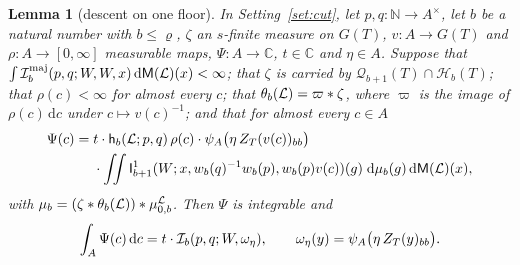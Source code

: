 \documentclass[11pt,a4paper]{article}
\theoremstyle{plainx}
\newtheorem{lemma}[theorem]{Lemma}
\theoremstyle{uprightx}
\newcommand{\cL}{\mathcal{L}}
\newcommand{\CC}{\mathbb{C}}
\newcommand{\NN}{\mathbb{N}}
\newcommand{\dd}{\mathrm{d}}
\newcommand{\GT}[1]{G(#1)}
\newcommand{\Hl}[2]{\mathcal{H}_{#1}(#2)}
\newcommand{\Ql}[2]{\mathcal{Q}_{#1}(#2)}
\newcommand{\ZT}[2]{Z_{#1}(#2)}
\newcommand{\wl}[2]{w_{#1}(#2)}
\begin{document}
\begin{lemma}[descent on one floor]\label{l:succ}
In Setting~\ref{set:cut}, let $p,q\colon\NN\to A^{\times}$, let $b$ be a natural number with $b\le\varrho$, $\zeta$
an $s$-finite measure on $\GT{T}$, $v\colon A\to\GT{T}$ and $\rho\colon A\to[0,\infty]$ measurable maps,
$\Psi\colon A\to\CC$, $t\in\CC$ and $\eta\in A$. Suppose that
$\int\formMajorant{b}{p}{q}{W}{W}{x}\,\dd\groupMeasure{\cL}(x)<\infty$; that $\zeta$ is carried by
$\Ql{b+1}{T}\cap\Hl{b}{T}$; that $\rho(c)<\infty$ for almost every $c$; that $\floorMeasure{\cL}{b}=\varpi*\zeta$,
where $\varpi$ is the image of $\rho(c)\,\dd c$ under $c\mapsto v(c)^{-1}$; and that for almost every $c\in A$
\[\begin{aligned}\Psi(c)={}&t\cdot\headDensity{b}{p}{q}{\cL}\,\rho(c)\cdot\psi_A\bigl(\eta\,\ZT{T}{v(c)}_{bb}\bigr)\\
&\cdot\iint\formIntegrandOne{b+1}{W}{x}{\weylRatio{b}{p}{q}}{\wl{b}{p}v(c)}{g}\;\dd\mu_b(g)\,\dd\groupMeasure{\cL}(x),\end{aligned}\]
with $\mu_b=(\zeta*\floorMeasure{\cL}{b})*\stackMeasure{\cL}_{0,b}$. Then $\Psi$ is integrable and
\[\int_A\Psi(c)\,\dd c=t\cdot\floorForm{b}{p}{q}{W}{\omega_\eta},\qquad\omega_\eta(y)=\psi_A\bigl(\eta\,\ZT{T}{y}_{bb}\bigr).\]
\end{lemma}
\end{document}
